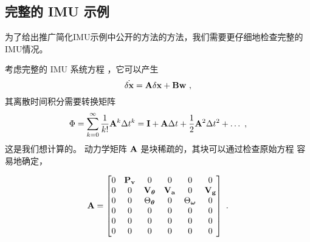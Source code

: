 \subsection{完整的 IMU 示例}
\label{sec:closedFormFullImu}

为了给出推广简化IMU示例中公开的方法的方法，我们需要更仔细地检查完整的IMU情况。

考虑完整的 IMU 系统方程 ，它可以产生
%
\begin{equation}
\dot{\delta{\bf x}} = {\bf A}\delta{\bf x} + {\bf B}{\bf w}~,
\end{equation}
%
其离散时间积分需要转换矩阵 
%
\begin{equation}
\Phi=\sum_{k=0}^\infty\frac{1}{k!}{\bf A}^k\Delta t^k = {\bf I} + {\bf A}\Delta t + \frac12{\bf A}^2\Delta t^2 + \dots~, \label{equ:tranmatseries}
\end{equation}
%
这是我们想计算的。 
动力学矩阵 ${\bf A}$ 是块稀疏的，其块可以通过检查原始方程  容易地确定，

%
\begin{equation}
{\bf A} = \begin{bmatrix}
  0& {\bf P}_{\bf v}&  0&  0&  0&  0\\
  0&  0& {\bf V}_{\bm \theta}& {\bf V}_{\bf a}&  0& {\bf V}_{\bf g}\\
  0&  0& \Theta_{\bm \theta}&  0& \Theta_{\bm \omega}
&  0\\
  0&  0&  0&  0&  0&  0\\
  0&  0&  0&  0&  0&  0\\
  0&  0&  0&  0&  0&  0
\end{bmatrix}~. \label{equ:FullIMU_Fmat}
\end{equation}
%

